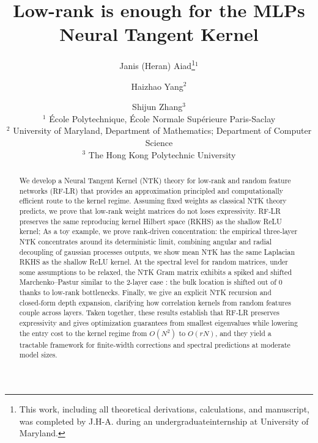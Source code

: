 \documentclass{article}
\title{Low-rank is enough for the MLPs Neural Tangent Kernel}
\author{
  Janis (Heran) Aiad\thanks{This work, including all theoretical derivations, calculations, and manuscript, was completed by J.H-A. during an undergraduateinternship at University of Maryland.}$^{1}$ \and Haizhao Yang$^{2}$ \and Shijun Zhang$^{3}$ \\
  $^{1}$ École Polytechnique, École Normale Supérieure Paris-Saclay  \\
  $^{2}$ University of Maryland, Department of Mathematics; Department of Computer Science \\
  $^{3}$ The Hong Kong Polytechnic University
}
\theoremstyle{definition}
\theoremstyle{plain}
\theoremstyle{remark}
\begin{document}
\maketitle

\begin{abstract}
We develop a Neural Tangent Kernel (NTK) theory for low-rank and random feature networks (RF‑LR) that provides an approximation principled and computationally 
efficient route to the kernel regime. Assuming fixed weights as classical NTK theory predicts, we prove that low-rank weight matrices
do not loses expressivity. RF‑LR preserves the same reproducing kernel Hilbert space (RKHS) as the shallow ReLU kernel; 
As a toy example, we prove rank‑driven concentration: the empirical three‑layer NTK concentrates around its 
deterministic limit, combining angular and radial decoupling of gaussian processes outputs, we show mean NTK
has the same Laplacian RKHS as the shallow ReLU kernel. At the spectral level for random matrices, under some assumptions to be relaxed, the NTK Gram matrix exhibits a 
spiked and shifted Marchenko–Pastur similar to the 2-layer case : the bulk location is shifted out of 0 thanks to low-rank bottlenecks.
Finally, we give an explicit NTK recursion and closed‑form depth expansion, clarifying how correlation kernels from random features couple across layers.
Taken together, these results establish that RF‑LR preserves expressivity and gives optimization guarantees from smallest eigenvalues
while lowering the entry cost to the kernel regime from \(O(N^2)\) to \(O(rN)\), 
and they yield a tractable framework for finite‑width corrections and spectral predictions at moderate model sizes.
\end{abstract}


\tableofcontents
\vspace{2em}

\newpage




\newpage





\newpage

\end{document}

